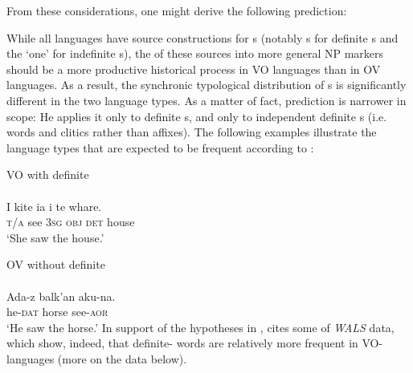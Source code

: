 \documentclass[output=paper]{langsci/langscibook}
\begin{document}
From these considerations, one might derive the following prediction:

\eanoraggedright\label{ex:ksb:2}
{While all languages have source constructions for s (notably s for definite s and the  ‘one’ for indefinite s), the  of these sources into more general NP markers should be a more productive historical process in VO languages than in OV languages. As a result, the synchronic typological distribution of s is significantly different in the two language types.}
\z
\noindent As a matter of fact,  prediction is narrower in scope: He applies it only to definite s, and only to independent definite s (i.e. words and clitics rather than affixes). The following examples illustrate the language types that are expected to be frequent according to :

\ea\label{ex:ksb:3}
\ea  VO with definite \\
\\
\gll I kite ia i te whare.\\
     \textsc{t/a}   see 3\textsc{sg}   \textsc{obj}   \textsc{det}   house\\
\glt ‘She saw the house.’

\ex
 OV without definite \\ 
\\
\gll Ada-z  balk’an   aku-na.\\
     he-\textsc{dat}   horse     see-\textsc{aor}\\
\glt ‘He saw the horse.’
\z
\z\newpage
\noindent In support of the hypotheses in ,  cites some of  \textit{WALS} data, which show, indeed, that definite- words are relatively more frequent in VO-languages (more on the data below).
\end{document}
